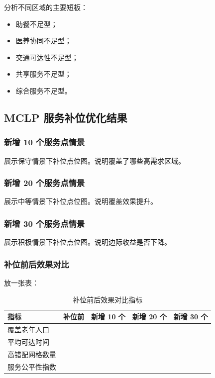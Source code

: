 分析不同区域的主要短板：

\begin{itemize}
\item 助餐不足型；
\item 医养协同不足型；
\item 交通可达性不足型；
\item 共享服务不足型；
\item 综合服务不足型。
\end{itemize}

\subsection{MCLP 服务补位优化结果}

\subsubsection{新增 10 个服务点情景}

展示保守情景下补位点位图。说明覆盖了哪些高需求区域。

\subsubsection{新增 20 个服务点情景}

展示中等情景下补位点位图。说明覆盖效果提升。

\subsubsection{新增 30 个服务点情景}

展示积极情景下补位点位图。说明边际收益是否下降。

\subsubsection{补位前后效果对比}

放一张表：

\begin{table}[H]
\centering
\caption{补位前后效果对比指标}
\begin{tabular}{lllll}
\toprule
\rowcolor{tablehead}
指标 & 补位前 & 新增 10 个 & 新增 20 个 & 新增 30 个 \\
\midrule
覆盖老年人口 &  &  &  &  \\
平均可达时间 &  &  &  &  \\
高错配网格数量 &  &  &  &  \\
服务公平性指数 &  &  &  &  \\
\bottomrule
\end{tabular}
\end{table}
